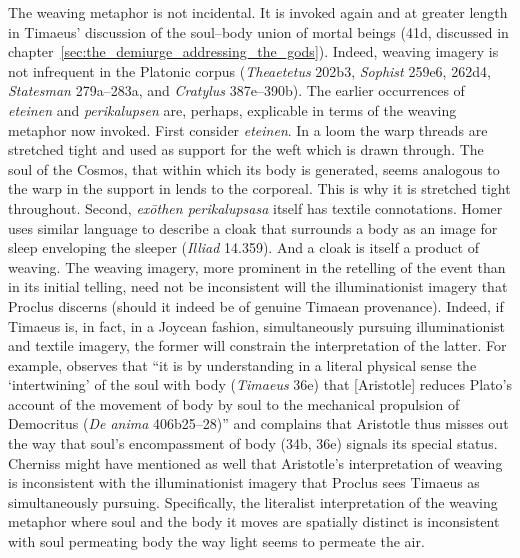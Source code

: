The weaving metaphor is not incidental. It is invoked again and at greater length in Timaeus' discussion of the soul--body union of mortal beings (41d, discussed in chapter~\ref{sec:the_demiurge_addressing_the_gods}). Indeed, weaving imagery is not infrequent in the Platonic corpus (\emph{Theaetetus} 202b3, \emph{Sophist} 259e6, 262d4, \emph{Statesman} 279a--283a, and \emph{Cratylus} 387e--390b). The earlier occurrences of \emph{eteinen} and \emph{perikalupsen} are, perhaps, explicable in terms of the weaving metaphor now invoked. First consider \emph{eteinen}. In a loom the warp threads are stretched tight and used as support for the weft which is drawn through. The soul of the Cosmos, that within which its body is generated, seems analogous to the warp in the support in lends to the corporeal. This is why it is stretched tight throughout. Second, \emph{exōthen perikalupsasa} itself has textile connotations. Homer uses similar language to describe a cloak that surrounds a body as an image for sleep enveloping the sleeper (\emph{Illiad} 14.359). And a cloak is itself a product of weaving. The weaving imagery, more prominent in the retelling of the event than in its initial telling, need not be inconsistent will the illuminationist imagery that Proclus discerns (should it indeed be of genuine Timaean provenance). Indeed, if Timaeus is, in fact, in a Joycean fashion, simultaneously pursuing illuminationist and textile imagery, the former will constrain the interpretation of the latter. For example, \citet[406]{Cherniss:1944aa} observes that ``it is by understanding in a literal physical sense the `intertwining' of the soul with body (\emph{Timaeus} 36e) that [Aristotle] reduces Plato's account of the movement of body by soul to the mechanical propulsion of Democritus (\emph{De anima} 406b25--28)'' and complains that Aristotle thus misses out the way that soul's encompassment of body (34b, 36e) signals its special status. Cherniss might have mentioned as well that Aristotle's interpretation of weaving is inconsistent with the illuminationist imagery that Proclus sees Timaeus as simultaneously pursuing. Specifically, the literalist interpretation of the weaving metaphor where soul and the body it moves are spatially distinct is inconsistent with soul permeating body the way light seems to permeate the air.

